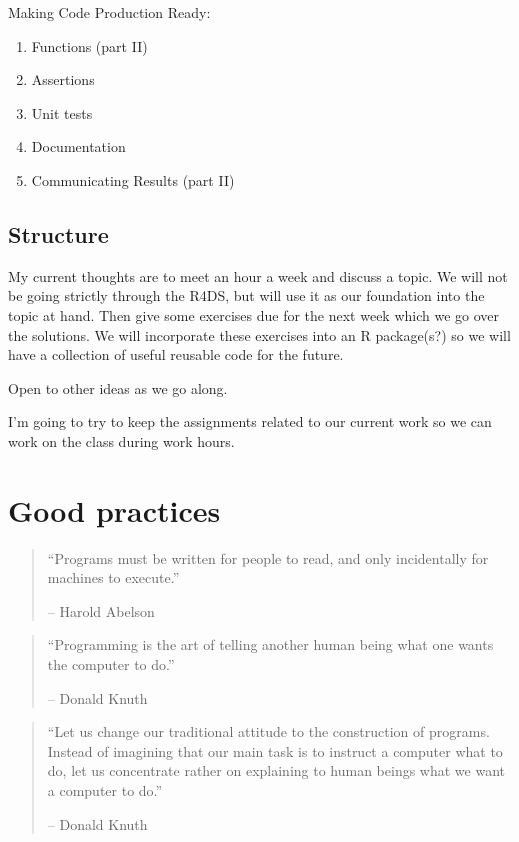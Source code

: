 \documentclass[]{book}
\providecommand{\tightlist}{%
  \setlength{\itemsep}{0pt}\setlength{\parskip}{0pt}}
\theoremstyle{definition}
\theoremstyle{definition}
\theoremstyle{definition}
\theoremstyle{remark}
\begin{document}
Making Code Production Ready:

\begin{enumerate}
\def\labelenumi{\arabic{enumi}.}
\setcounter{enumi}{9}
\tightlist
\item
  Functions (part II)
\item
  Assertions
\item
  Unit tests
\item
  Documentation
\item
  Communicating Results (part II)
\end{enumerate}

\section{Structure}\label{structure}

My current thoughts are to meet an hour a week and discuss a topic. We
will not be going strictly through the R4DS, but will use it as our
foundation into the topic at hand. Then give some exercises due for the
next week which we go over the solutions. We will incorporate these
exercises into an R package(s?) so we will have a collection of useful
reusable code for the future.

Open to other ideas as we go along.

I'm going to try to keep the assignments related to our current work so
we can work on the class during work hours.

\chapter{Good practices}\label{good-practices}

\begin{quote}
``Programs must be written for people to read, and only incidentally for
machines to execute.''

-- Harold Abelson
\end{quote}

\begin{quote}
``Programming is the art of telling another human being what one wants
the computer to do.''

-- Donald Knuth
\end{quote}

\begin{quote}
``Let us change our traditional attitude to the construction of
programs. Instead of imagining that our main task is to instruct a
computer what to do, let us concentrate rather on explaining to human
beings what we want a computer to do.''

-- Donald Knuth
\end{quote}
\end{document}
